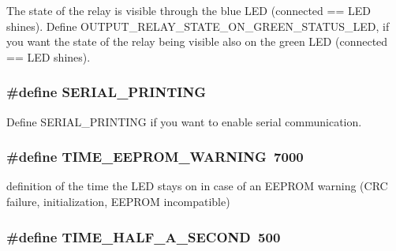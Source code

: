 The state of the relay is visible through the blue L\-E\-D (connected == L\-E\-D shines). Define O\-U\-T\-P\-U\-T\-\_\-\-R\-E\-L\-A\-Y\-\_\-\-S\-T\-A\-T\-E\-\_\-\-O\-N\-\_\-\-G\-R\-E\-E\-N\-\_\-\-S\-T\-A\-T\-U\-S\-\_\-\-L\-E\-D, if you want the state of the relay being visible also on the green L\-E\-D (connected == L\-E\-D shines). 

\hypertarget{WIFIOnOff_8ino_a111429b8fcdec5c5148837425261c18f}{
\subsubsection[{S\-E\-R\-I\-A\-L\-\_\-\-P\-R\-I\-N\-T\-I\-N\-G}]{\setlength{\rightskip}{0pt plus 5cm}\#define S\-E\-R\-I\-A\-L\-\_\-\-P\-R\-I\-N\-T\-I\-N\-G}}\label{WIFIOnOff_8ino_a111429b8fcdec5c5148837425261c18f}


Define S\-E\-R\-I\-A\-L\-\_\-\-P\-R\-I\-N\-T\-I\-N\-G if you want to enable serial communication. 

\hypertarget{WIFIOnOff_8ino_ad32448a40ca9e5dc0a62149d0f08bd5f}{
\subsubsection[{T\-I\-M\-E\-\_\-\-E\-E\-P\-R\-O\-M\-\_\-\-W\-A\-R\-N\-I\-N\-G}]{\setlength{\rightskip}{0pt plus 5cm}\#define T\-I\-M\-E\-\_\-\-E\-E\-P\-R\-O\-M\-\_\-\-W\-A\-R\-N\-I\-N\-G~7000}}\label{WIFIOnOff_8ino_ad32448a40ca9e5dc0a62149d0f08bd5f}


definition of the time the L\-E\-D stays on in case of an E\-E\-P\-R\-O\-M warning (C\-R\-C failure, initialization, E\-E\-P\-R\-O\-M incompatible) 

\hypertarget{WIFIOnOff_8ino_a87a8a26f2f6a9e14484ae0efabe91c99}{
\subsubsection[{T\-I\-M\-E\-\_\-\-H\-A\-L\-F\-\_\-\-A\-\_\-\-S\-E\-C\-O\-N\-D}]{\setlength{\rightskip}{0pt plus 5cm}\#define T\-I\-M\-E\-\_\-\-H\-A\-L\-F\-\_\-\-A\-\_\-\-S\-E\-C\-O\-N\-D~500}}\label{WIFIOnOff_8ino_a87a8a26f2f6a9e14484ae0efabe91c99}


